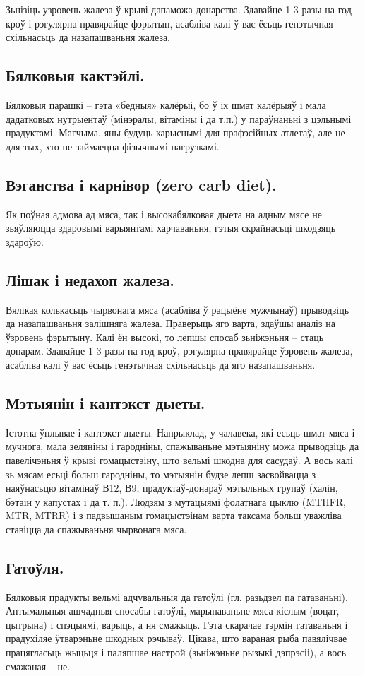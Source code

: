 Зьнізіць узровень жалеза ў крыві дапаможа донарства. Здавайце 1-3 разы на год кроў і рэгулярна правярайце фэрытын, асабліва калі ў вас ёсьць генэтычная схільнасьць да назапашваньня жалеза.

\subsection{Бялковыя кактэйлі.}
Бялковыя парашкі – гэта «бедныя» калёрыі, бо ў іх шмат калёрыяў і мала дадатковых нутрыентаў (мінэралы, вітаміны і да т.п.) у параўнаньні з цэльнымі прадуктамі. Магчыма, яны будуць карыснымі для прафэсійных атлетаў, але не для тых, хто не займаецца фізычнымі нагрузкамі.

\subsection{Вэганства і карнівор (zero carb diet).}
Як поўная адмова ад мяса, так і высокабялковая дыета на адным мясе не зьяўляюцца здаровымі варыянтамі харчаваньня, гэтыя скрайнасьці шкодзяць здароўю.

\subsection{Лішак і недахоп жалеза.}
Вялікая колькасьць чырвонага мяса (асабліва ў рацыёне мужчынаў) прыводзіць да назапашваньня залішняга жалеза. Праверыць яго варта, здаўшы аналіз на ўзровень фэрытыну. Калі ён высокі, то лепшы спосаб зьніжэньня – стаць донарам. Здавайце 1-3 разы на год кроў, рэгулярна правярайце ўзровень жалеза, асабліва калі ў вас ёсьць генэтычная схільнасьць да яго назапашваньня.

\subsection{Мэтыянін і кантэкст дыеты.}
Істотна ўплывае і кантэкст дыеты. Напрыклад, у чалавека, які есьць шмат мяса і мучнога, мала зеляніны і гародніны, спажываньне мэтыяніну можа прыводзіць да павелічэньня ў крыві гомацыстэіну, што вельмі шкодна для сасудаў. А вось калі зь мясам есьці больш гародніны, то мэтыянін будзе лепш засвойвацца з наяўнасьцю вітамінаў В12, В9, прадуктаў-донараў мэтыльных групаў (халін, бэтаін у капустах і да т. п.). Людзям з мутацыямі фолатнага цыклю (MTHFR, MTR, MTRR) і з падвышаным гомацыстэінам варта таксама больш уважліва ставіцца да спажываньня чырвонага мяса.

\subsection{Гатоўля.}
Бялковыя прадукты вельмі адчувальныя да гатоўлі (гл. разьдзел па гатаваньні). Аптымальныя ашчадныя спосабы гатоўлі, марынаваньне мяса кіслым (воцат, цытрына) і спэцыямі, варыць, а ня смажыць. Гэта скарачае тэрмін гатаваньня і прадухіляе ўтварэньне шкодных рэчываў. Цікава, што вараная рыба павялічвае працягласьць жыцьця і паляпшае настрой (зьніжэньне рызыкі дэпрэсіі), а вось смажаная – не.

